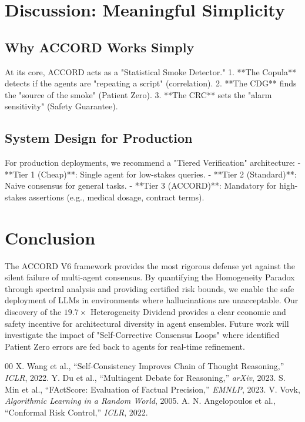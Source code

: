 \documentclass[conference]{IEEEtran}
\begin{document}
\section{Discussion: Meaningful Simplicity}

\subsection{Why ACCORD Works Simply}
At its core, ACCORD acts as a "Statistical Smoke Detector."
1. **The Copula** detects if the agents are "repeating a script" (correlation).
2. **The CDG** finds the "source of the smoke" (Patient Zero).
3. **The CRC** sets the "alarm sensitivity" (Safety Guarantee).

\subsection{System Design for Production}
For production deployments, we recommend a "Tiered Verification" architecture:
- **Tier 1 (Cheap)**: Single agent for low-stakes queries.
- **Tier 2 (Standard)**: Naive consensus for general tasks.
- **Tier 3 (ACCORD)**: Mandatory for high-stakes assertions (e.g., medical dosage, contract terms).

\section{Conclusion}

The ACCORD V6 framework provides the most rigorous defense yet against the silent failure of multi-agent consensus. By quantifying the Homogeneity Paradox through spectral analysis and providing certified risk bounds, we enable the safe deployment of LLMs in environments where hallucinations are unacceptable. Our discovery of the $19.7\times$ Heterogeneity Dividend provides a clear economic and safety incentive for architectural diversity in agent ensembles. Future work will investigate the impact of "Self-Corrective Consensus Loops" where identified Patient Zero errors are fed back to agents for real-time refinement.


\begin{thebibliography}{00}
 X. Wang et al., ``Self-Consistency Improves Chain of Thought Reasoning,'' \textit{ICLR}, 2022.
 Y. Du et al., ``Multiagent Debate for Reasoning,'' \textit{arXiv}, 2023.
 S. Min et al., ``FActScore: Evaluation of Factual Precision,'' \textit{EMNLP}, 2023.
 V. Vovk, \textit{Algorithmic Learning in a Random World}, 2005.
 A. N. Angelopoulos et al., ``Conformal Risk Control,'' \textit{ICLR}, 2022.
\end{thebibliography}
\end{document}
